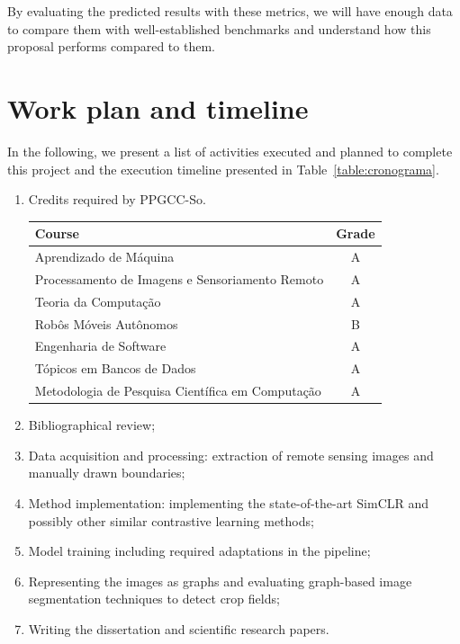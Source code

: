 \documentclass[12pt]{article}
\begin{document}
By evaluating the predicted results with these metrics, we will have enough data to compare them with well-established benchmarks and understand how this proposal performs compared to them.

\section{Work plan and timeline}\label{section:planotrabalho}

In the following, we present a list of activities executed and planned to complete this project and the execution timeline presented in Table~\ref{table:cronograma}.

\begin{enumerate}
	\item Credits required by PPGCC-So.

\begin{center}
	\begin{tabular}{|l|c|}
		\hline
		\textbf{Course} & \textbf{Grade} \\ \hline
		Aprendizado de Máquina & A \\ \hline
		Processamento de Imagens e Sensoriamento Remoto & A \\ \hline
		Teoria da Computação & A \\ \hline
		Robôs Móveis Autônomos & B \\ \hline
		Engenharia de Software & A \\ \hline
		Tópicos em Bancos de Dados & A \\ \hline
		Metodologia de Pesquisa Científica em Computação & A \\ \hline
	\end{tabular}
\end{center}	

	\item Bibliographical review;
	\item Data acquisition and processing: extraction of remote sensing images and manually drawn boundaries;
	\item Method implementation: implementing the state-of-the-art SimCLR and possibly other similar contrastive learning methods;
	\item Model training including required adaptations in the pipeline;
	\item Representing the images as graphs and evaluating graph-based image segmentation techniques to detect crop fields;
	\item Writing the dissertation and scientific research papers.


\end{enumerate}
\end{document}
